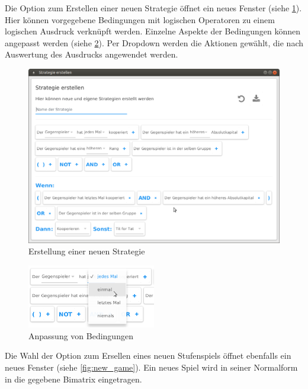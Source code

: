 \documentclass[parskip=full,11pt]{scrartcl}
\begin{document}
\newpage


Die Option zum Erstellen einer neuen \Gls{Strategie} öffnet ein neues Fenster (siehe \cref{fig:strategy}). Hier können vorgegebene Bedingungen mit logischen Operatoren zu einem logischen Ausdruck verknüpft werden. Einzelne Aspekte der Bedingungen können angepasst werden (siehe \cref{fig:strategy_drop}). Per Dropdown werden die Aktionen gewählt, die nach Auswertung des Ausdrucks angewendet werden.


\begin{figure}[hb]
	\centering
	\includegraphics[width=\textwidth]{images/strategy.png}
	\caption{\label{fig:strategy}
		Erstellung einer neuen \Gls{Strategie}}
\end{figure}


\begin{figure}[hb]
	\centering
	\includegraphics[width=0.5\textwidth]{images/strategy_drop.png}
	\caption{\label{fig:strategy_drop}
		Anpassung von Bedingungen}
\end{figure}

Die Wahl der Option zum Ersellen eines neuen Stufenspiels öffnet ebenfalls ein neues Fenster (siehe \cref{fig:new_game}). Ein neues Spiel wird in seiner Normalform in die gegebene Bimatrix eingetragen.
\end{document}
